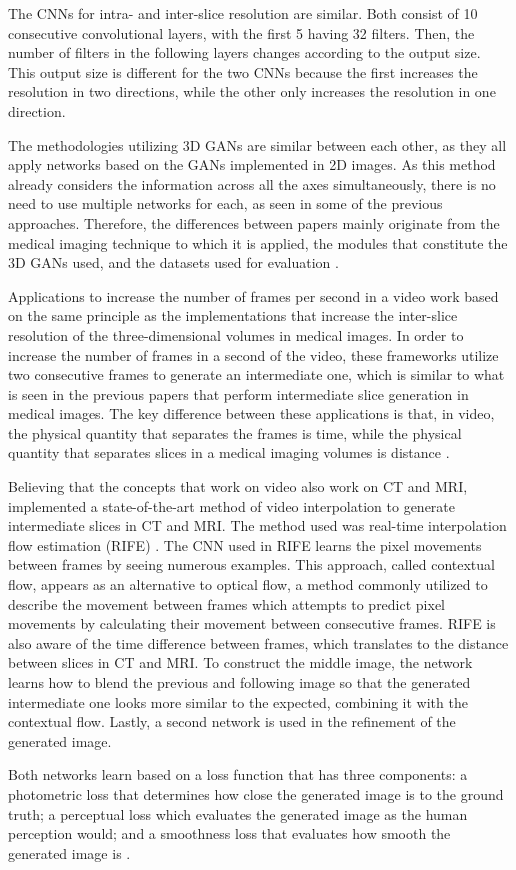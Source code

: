 \par
The CNNs for intra- and inter-slice resolution are similar. Both consist of 10 consecutive convolutional layers, with the first 5 having 32 filters. Then, the number of filters in the following layers changes according to the output size. This output size is different for the two CNNs because the first increases the resolution in two directions, while the other only increases the resolution in one direction.
\par
The methodologies utilizing 3D GANs are similar between each other, as they all apply networks based on the GANs implemented in 2D images. As this method already considers the information across all the axes simultaneously, there is no need to use multiple networks for each, as seen in some of the previous approaches. Therefore, the differences between papers mainly originate from the medical imaging technique to which it is applied, the modules that constitute the 3D GANs used, and the datasets used for evaluation \parencite{YChen2018, Sanchez2018, Kudo2019, Zhang2022}.
\par
Applications to increase the number of frames per second in a video work based on the same principle as the implementations that increase the inter-slice resolution of the three-dimensional volumes in medical images. In order to increase the number of frames in a second of the video, these frameworks utilize two consecutive frames to generate an intermediate one, which is similar to what is seen in the previous papers that perform intermediate slice generation in medical images. The key difference between these applications is that, in video, the physical quantity that separates the frames is time, while the physical quantity that separates slices in a medical imaging volumes is distance \parencite{Fang2022, Gambini2024}.
\par
Believing that the concepts that work on video also work on CT and MRI, \textcite{Gambini2024} implemented a state-of-the-art method of video interpolation to generate intermediate slices in CT and MRI. The method used was real-time interpolation flow estimation (RIFE) \parencite{Huang2022}. The CNN used in RIFE learns the pixel movements between frames by seeing numerous examples. This approach, called contextual flow, appears as an alternative to optical flow, a method commonly utilized to describe the movement between frames which attempts to predict pixel movements by calculating their movement between consecutive frames. RIFE is also aware of the time difference between frames, which translates to the distance between slices in CT and MRI. To construct the middle image, the network learns how to blend the previous and following image so that the generated intermediate one looks more similar to the expected, combining it with the contextual flow. Lastly, a second network is used in the refinement of the generated image.
\par
Both networks learn based on a loss function that has three components: a photometric loss that determines how close the generated image is to the ground truth; a perceptual loss which evaluates the generated image as the human perception would; and a smoothness loss that evaluates how smooth the generated image is \parencite{Huang2022}.


